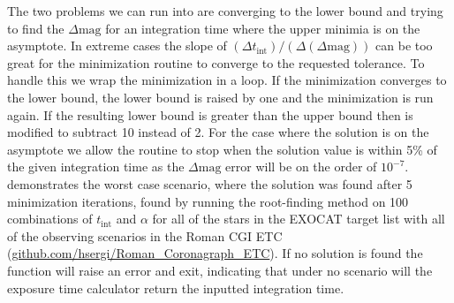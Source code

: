 The two problems we can run into are converging to the lower bound and trying
to find the $\Delta\textrm{mag}$ for an integration time where the upper
minimia is on the asymptote. In extreme cases the slope of $(\Delta  t_{\textrm{int}}) /
\left(\Delta(\Delta\textrm{mag})\right)$ can be too great for the minimization
routine to converge to the requested tolerance. To handle this we wrap the
minimization in a loop. If the minimization converges to the lower bound, the
lower bound is raised by one and the minimization is run again. If the
resulting lower bound is greater than the upper bound then  is
modified to subtract 10 instead of 2. For the case where the solution is on the
asymptote we allow the routine to stop when the solution value is within 5\% of
the given integration time as the $\Delta\textrm{mag}$ error will be on the
order of $10^{-7}$.  demonstrates the worst
case scenario, where the solution was found after 5 minimization iterations,
found by running the root-finding method on 100 combinations of $t_\textrm{int}$ and
$\alpha$ for all of the stars in the EXOCAT target list
\citep{turnbullExoCat1Nearby2015} with all of the observing scenarios in the
Roman CGI ETC (\url{github.com/hsergi/Roman_Coronagraph_ETC}). If no solution
is found the function will raise an error and exit, indicating that under no
scenario will the exposure time calculator return the inputted integration time.

